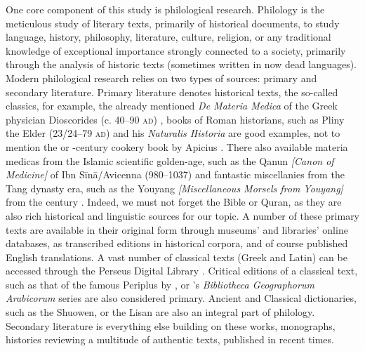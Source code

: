 One core component of this study is philological research. Philology is the meticulous study of literary texts, primarily of historical documents, to study language, history, philosophy, literature, culture, religion, or any traditional knowledge of exceptional importance strongly connected to a society, primarily through the analysis of historic texts (sometimes written in now dead languages). Modern philological research relies on two types of sources: primary and secondary literature. Primary literature denotes historical texts, the so-called classics, for example, the already mentioned \textit{De Materia Medica} of the Greek physician Dioscorides (c. 40--90 \textsc{ad}) \autocite{dioscorides_materia_2005}, books of Roman historians, such as Pliny the Elder (23/24--79 \textsc{ad}) and his \textit{Naturalis Historia} \autocite{pliny_the_elder_natural_1855} are good examples, not to mention the or -century cookery book by Apicius \autocite{apicius_apicius_1977}. There also available \glspl{materia medica} from the Islamic scientific golden-age, such as the \gls{Qanun} \textit{[Canon of Medicine]} of Ibn Sīnā/Avicenna (980--1037) \autocite{ibn_sina_-qanun_1329} and fantastic miscellanies from the Tang dynasty era, such as the \gls{Youyang} \textit{[Miscellaneous Morsels from Youyang]} from the  century \autocite{yyzz}. Indeed, we must not forget the Bible or Quran, as they are also rich historical and linguistic sources for our topic. A number of these primary texts are available in their original form through museums' and libraries' online databases, as transcribed editions in historical corpora, and of course published English translations. A vast number of classical texts (Greek and Latin) can be accessed through the Perseus Digital Library \autocite{crane_perseus_nodate}. Critical editions of a classical text, such as that of the famous \gls{Periplus} by \textcite{casson_periplus_1989}, or \textcite{de_goeje_bibliotheca_1870}'s \textit{Bibliotheca Geographorum Arabicorum} series are also considered primary. Ancient and Classical dictionaries, such as the \gls{Shuowen}, or the \gls{Lisan} are also an integral part of philology. Secondary literature is everything else building on these works, monographs, histories reviewing a multitude of authentic texts, published in recent times.




